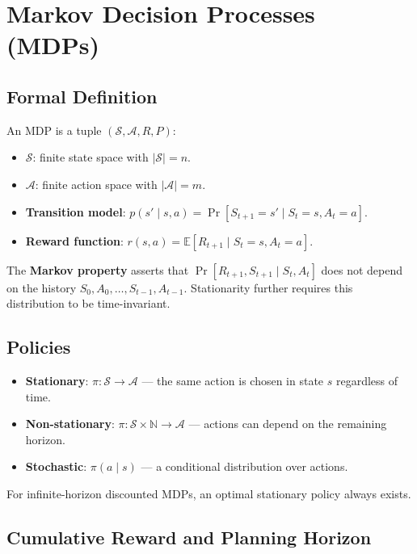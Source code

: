 \documentclass[11pt,a4paper]{article}
\theoremstyle{definition}
\theoremstyle{plain}
\theoremstyle{remark}
\begin{document}
\section{Markov Decision Processes (MDPs)}

\subsection{Formal Definition}

An MDP is a tuple $(\mathcal{S}, \mathcal{A}, R, P)$:
\begin{itemize}
    \item $\mathcal{S}$: finite state space with $|\mathcal{S}| = n$.
    \item $\mathcal{A}$: finite action space with $|\mathcal{A}| = m$.
    \item \textbf{Transition model}: $p(s' \mid s, a) = \Pr[S_{t+1} = s' \mid S_t = s, A_t = a]$.
    \item \textbf{Reward function}: $r(s, a) = \mathbb{E}[R_{t+1} \mid S_t = s, A_t = a]$.
\end{itemize}

The \textbf{Markov property} asserts that $\Pr[R_{t+1}, S_{t+1} \mid S_t, A_t]$ does not depend on the history $S_0, A_0, \ldots, S_{t-1}, A_{t-1}$. Stationarity further requires this distribution to be time-invariant.

\subsection{Policies}

\begin{itemize}
    \item \textbf{Stationary}: $\pi : \mathcal{S} \to \mathcal{A}$ — the same action is chosen in state $s$ regardless of time.
    \item \textbf{Non-stationary}: $\pi : \mathcal{S} \times \mathbb{N} \to \mathcal{A}$ — actions can depend on the remaining horizon.
    \item \textbf{Stochastic}: $\pi(a \mid s)$ — a conditional distribution over actions.
\end{itemize}

For infinite-horizon discounted MDPs, an optimal stationary policy always exists.

\subsection{Cumulative Reward and Planning Horizon}
\end{document}
